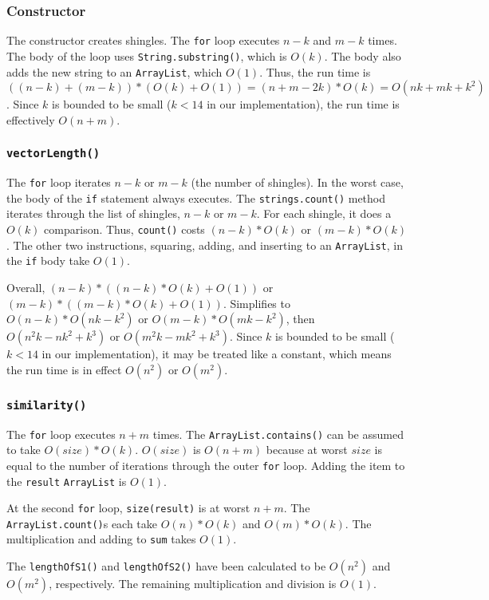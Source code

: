 \documentclass[10pt,letterpaper]{article}
\begin{document}
\subsubsection{Constructor}
The constructor creates shingles. The \texttt{for} loop executes $n-k$ and $m-k$ times.
The body of the loop uses \texttt{String.substring()}, which is $O(k)$.
The body also adds the new string to an \texttt{ArrayList}, which $O(1)$.
Thus, the run time is $((n-k)+(m-k))*(O(k)+O(1))=(n+m-2k)*O(k)=O(nk+mk+k^2)$.
Since $k$ is bounded to be small ($k<14$ in our implementation), the run time is
effectively $O(n+m)$.
\subsubsection{\texttt{vectorLength()}}
The \texttt{for} loop iterates $n-k$ or $m-k$ (the number of shingles).
In the worst case, the body of the \texttt{if} statement always executes.
The \texttt{strings.count()} method iterates through the list of shingles, $n-k$ or $m-k$.
For each shingle, it does a $O(k)$ comparison. Thus, \texttt{count()} costs
$(n-k)*O(k)$ or $(m-k)*O(k)$. The other two instructions, squaring, adding,
and inserting to an \texttt{ArrayList}, in the \texttt{if} body take $O(1)$.

Overall, $(n-k)*((n-k)*O(k)+O(1))$ or $(m-k)*((m-k)*O(k)+O(1))$. Simplifies to
$O(n-k)*O(nk-k^2)$ or $O(m-k)*O(mk-k^2)$, then $O(n^2k-nk^2+k^3)$ or
$O(m^2k-mk^2+k^3)$.  Since $k$ is bounded to be small ($k<14$ in our
implementation), it may be treated like a constant, which means the run time is
in effect $O(n^2)$ or $O(m^2)$.
\subsubsection{\texttt{similarity()}}
The \texttt{for} loop executes $n+m$ times. The \texttt{ArrayList.contains()}
can be assumed to take $O(size)*O(k)$. $O(size)$ is $O(n+m)$ because at worst
$size$ is equal to the number of iterations through the outer \texttt{for} loop.
Adding the item to the \texttt{result} \texttt{ArrayList} is $O(1)$.

At the second \texttt{for} loop, \texttt{size(result)} is at worst $n+m$.
The \texttt{ArrayList.count()}s each take $O(n)*O(k)$ and $O(m)*O(k)$. The
multiplication and adding to \texttt{sum} takes $O(1)$.

The \texttt{lengthOfS1()} and \texttt{lengthOfS2()} have been calculated to be
$O(n^2)$ and $O(m^2)$, respectively. The remaining multiplication and division
is $O(1)$.
\end{document}
